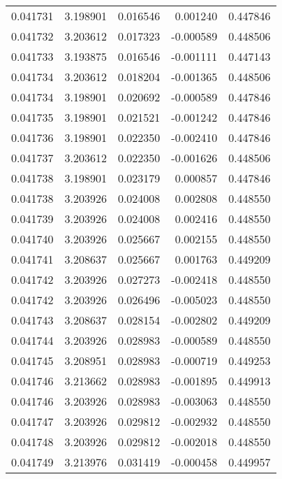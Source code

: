 \begin{tabular}{lrrrr}
0.041731    &  3.198901 &  0.016546 &  0.001240 &             0.447846 \\
0.041732    &  3.203612 &  0.017323 & -0.000589 &             0.448506 \\
0.041733    &  3.193875 &  0.016546 & -0.001111 &             0.447143 \\
0.041734    &  3.203612 &  0.018204 & -0.001365 &             0.448506 \\
0.041734    &  3.198901 &  0.020692 & -0.000589 &             0.447846 \\
0.041735    &  3.198901 &  0.021521 & -0.001242 &             0.447846 \\
0.041736    &  3.198901 &  0.022350 & -0.002410 &             0.447846 \\
0.041737    &  3.203612 &  0.022350 & -0.001626 &             0.448506 \\
0.041738    &  3.198901 &  0.023179 &  0.000857 &             0.447846 \\
0.041738    &  3.203926 &  0.024008 &  0.002808 &             0.448550 \\
0.041739    &  3.203926 &  0.024008 &  0.002416 &             0.448550 \\
0.041740    &  3.203926 &  0.025667 &  0.002155 &             0.448550 \\
0.041741    &  3.208637 &  0.025667 &  0.001763 &             0.449209 \\
0.041742    &  3.203926 &  0.027273 & -0.002418 &             0.448550 \\
0.041742    &  3.203926 &  0.026496 & -0.005023 &             0.448550 \\
0.041743    &  3.208637 &  0.028154 & -0.002802 &             0.449209 \\
0.041744    &  3.203926 &  0.028983 & -0.000589 &             0.448550 \\
0.041745    &  3.208951 &  0.028983 & -0.000719 &             0.449253 \\
0.041746    &  3.213662 &  0.028983 & -0.001895 &             0.449913 \\
0.041746    &  3.203926 &  0.028983 & -0.003063 &             0.448550 \\
0.041747    &  3.203926 &  0.029812 & -0.002932 &             0.448550 \\
0.041748    &  3.203926 &  0.029812 & -0.002018 &             0.448550 \\
0.041749    &  3.213976 &  0.031419 & -0.000458 &             0.449957 \\

\end{tabular}
